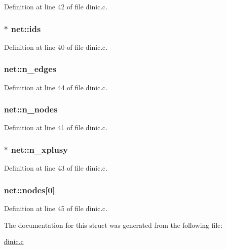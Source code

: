 Definition at line 42 of file dinic.c.

\hypertarget{structnet_a65ad82aa1f6958764f1b013edab176d3}{
\subsubsection[{ids}]{$\ast$ {\bf net::ids}}}
\label{structnet_a65ad82aa1f6958764f1b013edab176d3}


Definition at line 40 of file dinic.c.

\hypertarget{structnet_a974463f2ba7452a6a24e47f7d367044b}{
\subsubsection[{n\_\-edges}]{ {\bf net::n\_\-edges}}}
\label{structnet_a974463f2ba7452a6a24e47f7d367044b}


Definition at line 44 of file dinic.c.

\hypertarget{structnet_ab35d5061a46ece7e30e85eba1da28d5f}{
\subsubsection[{n\_\-nodes}]{ {\bf net::n\_\-nodes}}}
\label{structnet_ab35d5061a46ece7e30e85eba1da28d5f}


Definition at line 41 of file dinic.c.

\hypertarget{structnet_a7b32b1c4800895356bdfe16a25698623}{
\subsubsection[{n\_\-xplusy}]{$\ast$ {\bf net::n\_\-xplusy}}}
\label{structnet_a7b32b1c4800895356bdfe16a25698623}


Definition at line 43 of file dinic.c.

\hypertarget{structnet_a35da0fe3822c408960175a614825cf6e}{
\subsubsection[{nodes}]{ {\bf net::nodes}\mbox{[}0\mbox{]}}}
\label{structnet_a35da0fe3822c408960175a614825cf6e}


Definition at line 45 of file dinic.c.



The documentation for this struct was generated from the following file:\begin{DoxyCompactItemize}
\item 
\hyperlink{dinic_8c}{dinic.c}\end{DoxyCompactItemize}
